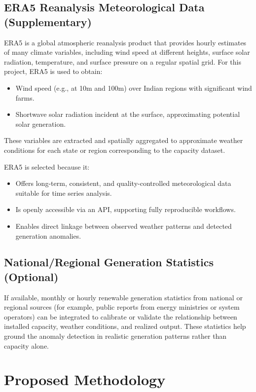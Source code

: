 \documentclass[12pt,a4paper]{article}
\begin{document}
\subsection{ERA5 Reanalysis Meteorological Data (Supplementary)}
ERA5 is a global atmospheric reanalysis product that provides hourly estimates of many climate variables, including wind speed at different heights, surface solar radiation, temperature, and surface pressure on a regular spatial grid.\cite{era5} For this project, ERA5 is used to obtain:
\begin{itemize}
    \item Wind speed (e.g., at 10m and 100m) over Indian regions with significant wind farms.
    \item Shortwave solar radiation incident at the surface, approximating potential solar generation.
\end{itemize}
These variables are extracted and spatially aggregated to approximate weather conditions for each state or region corresponding to the capacity dataset.\cite{era5}

ERA5 is selected because it:
\begin{itemize}
    \item Offers long-term, consistent, and quality-controlled meteorological data suitable for time series analysis.\cite{era5}
    \item Is openly accessible via an API, supporting fully reproducible workflows.\cite{era5}
    \item Enables direct linkage between observed weather patterns and detected generation anomalies.\cite{grid_change_point}
\end{itemize}

\subsection{National/Regional Generation Statistics (Optional)}
If available, monthly or hourly renewable generation statistics from national or regional sources (for example, public reports from energy ministries or system operators) can be integrated to calibrate or validate the relationship between installed capacity, weather conditions, and realized output.\cite{eu_space_time,lead_anomaly} These statistics help ground the anomaly detection in realistic generation patterns rather than capacity alone.\cite{eu_space_time}

\section{Proposed Methodology}
\end{document}
